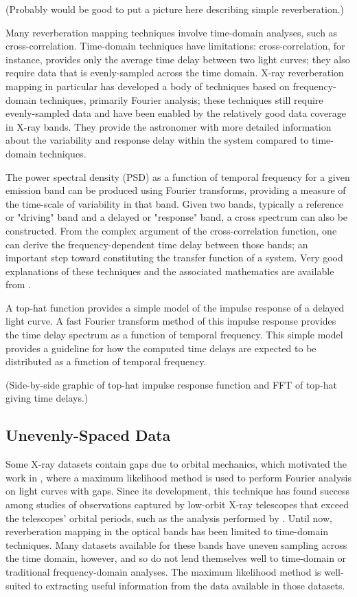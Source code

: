 \documentclass[11pt,letterpaper]{article}
\begin{document}
	(Probably would be good to put a picture here describing simple
	reverberation.)

	Many reverberation mapping techniques involve time-domain analyses, such
	as cross-correlation. Time-domain techniques have limitations:
	cross-correlation, for instance, provides only the average time delay
	between two light curves; they also require data that is evenly-sampled
	across the time domain. X-ray reverberation mapping in particular has
	developed a body of techniques based on frequency-domain techniques,
	primarily Fourier analysis; these techniques still require evenly-sampled
	data and have been enabled by the relatively good data coverage in X-ray
	bands. They provide the astronomer with more detailed information about
	the variability and response delay within the system compared to
	time-domain techniques.

	The power spectral density (PSD) as a function of temporal frequency for a
	given emission band can be produced using Fourier transforms, providing a
	measure of the time-scale of variability in that band. Given two bands,
	typically a reference or "driving" band and a delayed or "response" band,
	a cross spectrum can also be constructed. From the complex
	argument of the cross-correlation function, one can derive the
	frequency-dependent time delay between those bands; an important step
	toward
	constituting the transfer function of a system. Very good explanations of
	these techniques and the associated mathematics are available from
	\cite{2014A&ARv..22...72U}.

	A top-hat function provides a simple model of the impulse response of a
	delayed light curve. A fast Fourier transform method of this impulse
	response provides the time delay spectrum as a function of temporal
	frequency. This simple model provides a guideline for how the computed
	time delays are expected to be distributed as a function of temporal
	frequency.


	(Side-by-side graphic of top-hat impulse response function and FFT of
	top-hat giving time delays.)

	\subsection{Unevenly-Spaced Data}
 	
 	Some X-ray datasets contain gaps due to orbital mechanics, which motivated
	the work in \cite{2013ApJ...777...24Z}, where a maximum likelihood method
	is used to perform Fourier analysis on light curves with gaps. Since its
	development, this technique has found success among studies of
	observations captured by low-orbit X-ray telescopes that exceed the
	telescopes' orbital periods, such as the analysis performed by
	\cite{2016arXiv160606736K}. Until now, reverberation mapping in the
	optical bands has been limited to time-domain techniques. Many datasets
	available for these bands have uneven sampling across the time domain,
	however, and so do not lend themselves well to time-domain or traditional
	frequency-domain analyses. The maximum likelihood method is well-suited
	to extracting useful information from the data available in those
	datasets.
\end{document}
